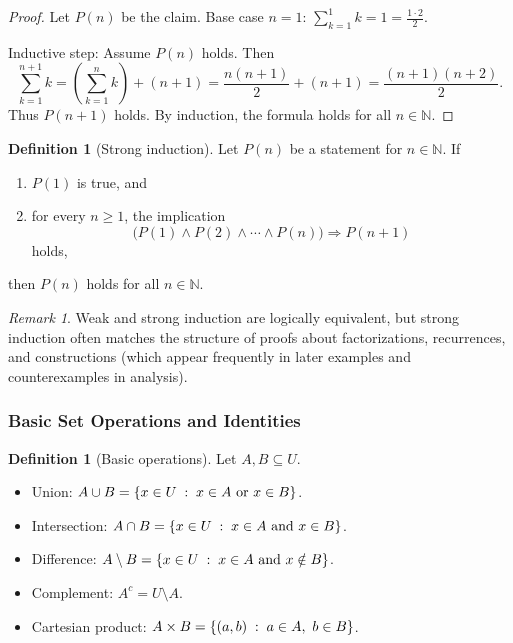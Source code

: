 \documentclass[12pt]{article}
\numberwithin{equation}{section}
\newcommand{\NN}{\mathbb{N}}
\DeclarePairedDelimiter{\set}{\{}{\}}
\newcommand{\st}{\;:\;}                      %
\theoremstyle{plain}
\theoremstyle{definition}
\newtheorem{definition}[theorem]{Definition}
\theoremstyle{remark}
\newtheorem{remark}[theorem]{Remark}
\begin{document}
\begin{proof}
Let $P(n)$ be the claim.  
Base case $n=1$: $\sum_{k=1}^1 k =1 = \frac{1\cdot 2}{2}$.

Inductive step: Assume $P(n)$ holds. Then
\[
\sum_{k=1}^{n+1} k
= \left(\sum_{k=1}^n k\right) + (n+1)
= \frac{n(n+1)}{2} + (n+1)
= \frac{(n+1)(n+2)}{2}.
\]
Thus $P(n+1)$ holds. By induction, the formula holds for all $n\in\NN$.
\end{proof}

\begin{definition}[Strong induction]
Let $P(n)$ be a statement for $n\in\NN$. If
\begin{enumerate}
  \item $P(1)$ is true, and
  \item for every $n\ge 1$, the implication
  \[
  \bigl(P(1)\wedge P(2)\wedge \cdots \wedge P(n)\bigr)\Rightarrow P(n+1)
  \]
  holds,
\end{enumerate}
then $P(n)$ holds for all $n\in\NN$.
\end{definition}

\begin{remark}
Weak and strong induction are logically equivalent, but strong induction often matches the structure of proofs about factorizations, recurrences, and constructions (which appear frequently in later examples and counterexamples in analysis).
\end{remark}

\subsubsection{Basic Set Operations and Identities}

\begin{definition}[Basic operations]
Let $A,B\subseteq U$.
\begin{itemize}
  \item Union: $A\cup B = \set*{x\in U \st x\in A \text{ or } x\in B}$.
  \item Intersection: $A\cap B = \set*{x\in U \st x\in A \text{ and } x\in B}$.
  \item Difference: $A\setminus B = \set*{x\in U \st x\in A \text{ and } x\notin B}$.
  \item Complement: $A^c = U\setminus A$.
  \item Cartesian product: $A\times B = \set*{(a,b) \st a\in A,\ b\in B}$.
\end{itemize}
\end{definition}
\end{document}
